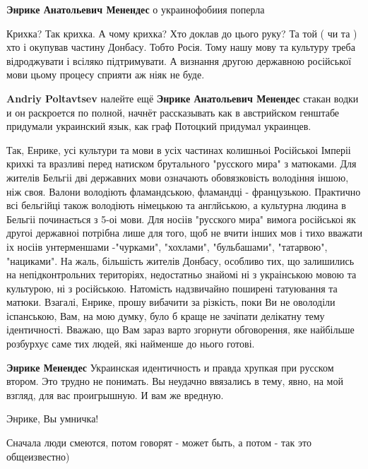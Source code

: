 \begin{itemize}
\begin{itemize}
\textbf{Энрике Анатольевич Менендес} о украинофобиия поперла


Крихка? Так крихка. А чому крихка? Хто доклав до цього руку? Та той ( чи та
) хто і окупував частину Донбасу. Тобто Росія. Тому нашу мову та культуру
треба відроджувати і всіляко підтримувати. А визнання другою державною
російської мови цьому процесу сприяти аж ніяк не буде.


\textbf{Andriy Poltavtsev} налейте ещё \textbf{Энрике Анатольевич Менендес} стакан водки и он раскроется по полной, начнёт рассказывать как в австрийском генштабе придумали украинский язык, как граф Потоцкий придумал украинцев.


Так, Енрике, усі культури та мови в усіх частинах колишньоі Російськоі Імперіі
крихкі та вразливі перед натиском брутального "русского мира" з матюками. Для
жителів Бельгіі дві державних мови означають обовязковість володіння іншою, ніж
своя. Валони володіють фламандською, фламандці - французькою. Практично всі
бельгійці також володіють німецькою та англйською, а культурна людина в Бельгіі
починається з 5-оі мови. Для носіів "русского мира" вимога російськоі як другоі
державноі потрібна лише для того, щоб не вчити інших мов і тихо вважати іх
носіів унтерменшами -"чурками", "хохлами", "бульбашами", "татарвою",
"нациками". На жаль, більшість жителів Донбасу, особливо тих, що залишились на
непідконтрольних територіях, недостатньо знайомі ні з украінською мовою та
культурою, ні з російською. Натомість надзвичайно поширені татуювання та
матюки. Взагалі, Енрике, прошу вибачити за різкість, поки Ви не оволоділи
іспанською, Вам, на мою думку, було б краще не зачіпати делікатну тему
ідентичності. Вважаю, що Вам зараз варто згорнути обговорення, яке найбільше
розбурхує саме тих людей, які найменше до нього готові.

\textbf{Энрике Менендес} Украинская идентичность и правда хрупкая при русском втором. Это трудно не понимать. Вы неудачно ввязались в тему, явно, на мой взгляд, для вас проигрышную. И вам же вредную.

\end{itemize} %

Энрике, Вы умничка!

\begin{itemize} %
Сначала люди смеются, потом говорят - может быть, а потом - так это общеизвестно)


\end{itemize}
\end{itemize}

